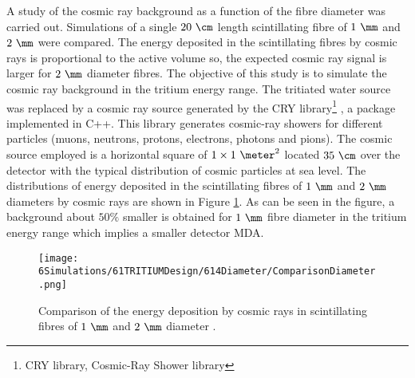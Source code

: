 A study of the cosmic ray background as a function of the fibre diameter was carried out. Simulations of a single $20~\cm$ length scintillating fibre of $1~\mm$ and $2~\mm$ were compared. The energy deposited in the scintillating fibres by cosmic rays is proportional to the active volume so, the expected cosmic ray signal is larger for $2~\mm$ diameter fibres. The objective of this study is to simulate the cosmic ray background in the tritium energy range. The tritiated water source was replaced by a cosmic ray source generated by the CRY library\footnote{CRY library, Cosmic-Ray Shower library} \cite{CRYwebsite, CRYpaper}, a package implemented in C++. This library generates cosmic-ray showers for different particles (muons, neutrons, protons, electrons, photons and pions). The cosmic source employed is a horizontal square of $1 \times 1~\meter ^2$ located $35~\cm$ over the detector with the typical distribution of cosmic particles at sea level. The distributions of energy deposited in the scintillating fibres of $1~\mm$ and $2~\mm$ diameters by cosmic rays are shown in Figure \ref{fig:DiameterComparison}. As can be seen in the figure, a background about $50\%$ smaller is obtained for $1~\mm$ fibre diameter in the tritium energy range which implies a smaller detector MDA. %

\begin{figure}[hbtp]
\centering
\texttt{[image: 6Simulations/61TRITIUMDesign/614Diameter/ComparisonDiameter.png]}
\caption{Comparison of the energy deposition by cosmic rays in scintillating fibres of $1~\mm$ and $2~\mm$ diameter \cite{SimulationPaperCarlos}.\label{fig:DiameterComparison}}
\end{figure}